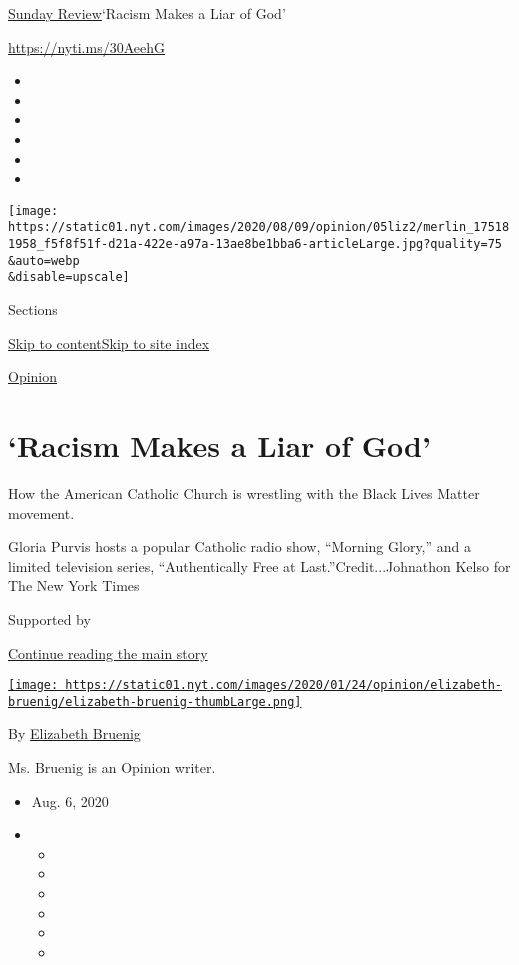 \href{/section/opinion/sunday}{Sunday Review}\textbar{}`Racism Makes a
Liar of God'

\href{https://nyti.ms/30AeehG}{https://nyti.ms/30AeehG}

\begin{itemize}
\item
\item
\item
\item
\item
\item
\end{itemize}

\texttt{[image: https://static01.nyt.com/images/2020/08/09/opinion/05liz2/merlin\_175181958\_f5f8f51f-d21a-422e-a97a-13ae8be1bba6-articleLarge.jpg?quality=75\\\&auto=webp\\\&disable=upscale]}

Sections

\protect\hyperlink{site-content}{Skip to
content}\protect\hyperlink{site-index}{Skip to site index}

\href{/section/opinion}{Opinion}

\hypertarget{racism-makes-a-liar-of-god}{%
\section{`Racism Makes a Liar of
God'}\label{racism-makes-a-liar-of-god}}

How the American Catholic Church is wrestling with the Black Lives
Matter movement.

Gloria Purvis hosts a popular Catholic radio show, ``Morning Glory,''
and a limited television series, ``Authentically Free at
Last.''Credit...Johnathon Kelso for The New York Times

Supported by

\protect\hyperlink{after-sponsor}{Continue reading the main story}

\href{https://www.nytimes.com/by/elizabeth-bruenig}{\texttt{[image: https://static01.nyt.com/images/2020/01/24/opinion/elizabeth-bruenig/elizabeth-bruenig-thumbLarge.png]}}

By \href{https://www.nytimes.com/by/elizabeth-bruenig}{Elizabeth
Bruenig}

Ms. Bruenig is an Opinion writer.

\begin{itemize}
\item
  Aug. 6, 2020
\item
  \begin{itemize}
  \item
  \item
  \item
  \item
  \item
  \item
  \end{itemize}
\end{itemize}

